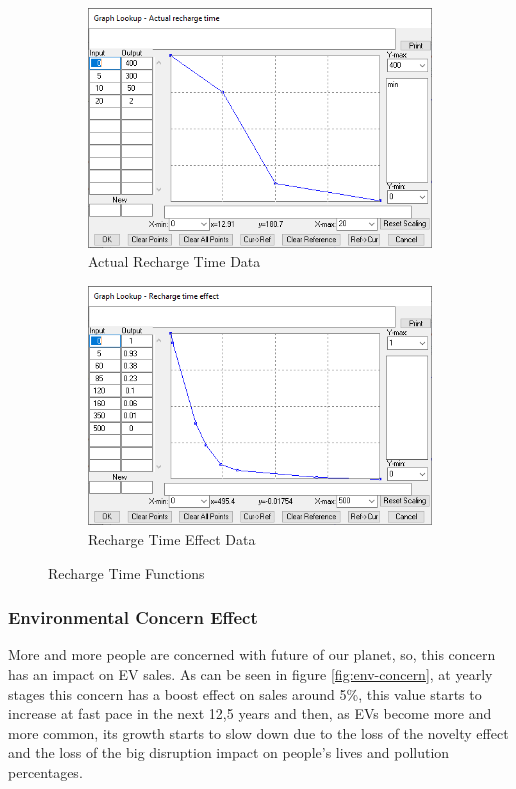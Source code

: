 \begin{figure}[htbp]
\centering
\begin{subfigure}{0.5\textwidth}
  \centering
  \includegraphics[width=0.89\linewidth]{img/recharge-time.png}
  \caption{Actual Recharge Time Data}
  \label{fig:recharge-time}
\end{subfigure}%
\begin{subfigure}{0.5\textwidth}
  \centering
  \includegraphics[width=0.89\linewidth]{img/recharge-time-effect.png}
  \caption{Recharge Time Effect Data}
  \label{fig:recharge-time-effect}
\end{subfigure}
\caption{Recharge Time Functions}
\label{fig:recharge-time-funcs}
\end{figure}

\subsubsection{Environmental Concern Effect}
More and more people are concerned with future of our planet, so, this concern has an impact on EV sales. As can be seen in figure \ref{fig:env-concern}, at yearly stages this concern has a boost effect on sales around 5\%, this value starts to increase at fast pace in the next 12,5 years and then, as EVs become more and more common, its growth starts to slow down due to the loss of the novelty effect and the loss of the big disruption impact on people's lives and pollution percentages.

